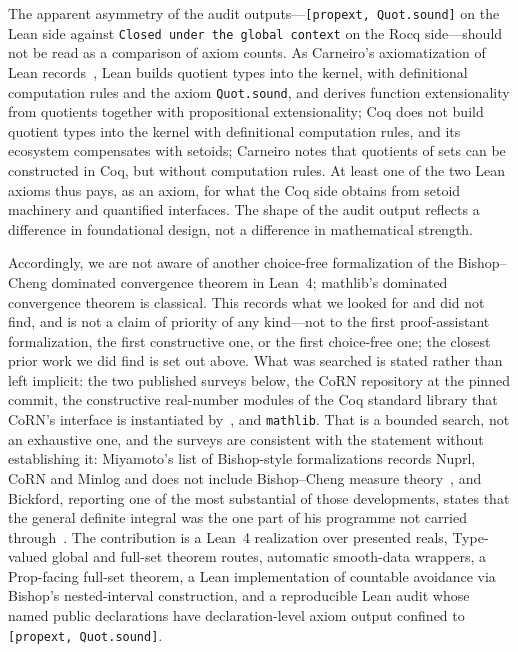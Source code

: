 \documentclass[11pt]{article}
\theoremstyle{definition}
\theoremstyle{remark}
\begin{document}
The apparent asymmetry of the audit outputs---\texttt{[propext, Quot.sound]} on the Lean side against \texttt{Closed under the global context} on the Rocq side---should not be read as a comparison of axiom counts.  As Carneiro's axiomatization of Lean records~\cite{carneiro-2019}, Lean builds quotient types into the kernel, with definitional computation rules and the axiom \texttt{Quot.sound}, and derives function extensionality from quotients together with propositional extensionality; Coq does not build quotient types into the kernel with definitional computation rules, and its ecosystem compensates with setoids; Carneiro notes that quotients of sets can be constructed in Coq, but without computation rules.  At least one of the two Lean axioms thus pays, as an axiom, for what the Coq side obtains from setoid machinery and quantified interfaces.  The shape of the audit output reflects a difference in foundational design, not a difference in mathematical strength.

Accordingly, we are not aware of another choice-free formalization of the Bishop--Cheng dominated convergence theorem in Lean~4; mathlib's dominated convergence theorem is classical.  This records what we looked for and did not find, and is not a claim of priority of any kind---not to the first proof-assistant formalization, the first constructive one, or the first choice-free one; the closest prior work we did find is set out above.  What was searched is stated rather than left implicit: the two published surveys below, the CoRN repository at the pinned commit, the constructive real-number modules of the Coq standard library that CoRN's interface is instantiated by~\cite{coq-constructive-reals}, and \texttt{mathlib}.  That is a bounded search, not an exhaustive one, and the surveys are consistent with the statement without establishing it: Miyamoto's list of Bishop-style formalizations records Nuprl, CoRN and Minlog and does not include Bishop--Cheng measure theory~\cite[\S27.3.4]{miyamoto-2023}, and Bickford, reporting one of the most substantial of those developments, states that the general definite integral was the one part of his programme not carried through~\cite[\S28.14]{bickford-2023}.  The contribution is a Lean~4 realization over presented reals, Type-valued global and full-set theorem routes, automatic smooth-data wrappers, a Prop-facing full-set theorem, a Lean implementation of countable avoidance via Bishop's nested-interval construction, and a reproducible Lean audit whose named public declarations have declaration-level axiom output confined to \texttt{[propext, Quot.sound]}.
\end{document}
